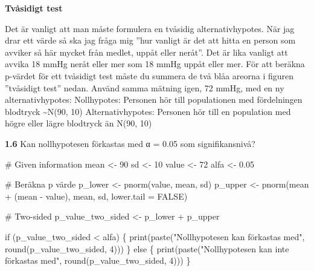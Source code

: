 \documentclass[
  letterpaper,
  DIV=11,
  numbers=noendperiod]{scrartcl}
\newenvironment{Shaded}{\begin{snugshade}}{\end{snugshade}}
\newcommand{\AttributeTok}[1]{\textcolor[rgb]{0.40,0.45,0.13}{#1}}
\newcommand{\CommentTok}[1]{\textcolor[rgb]{0.37,0.37,0.37}{#1}}
\newcommand{\ConstantTok}[1]{\textcolor[rgb]{0.56,0.35,0.01}{#1}}
\newcommand{\ControlFlowTok}[1]{\textcolor[rgb]{0.00,0.23,0.31}{#1}}
\newcommand{\DecValTok}[1]{\textcolor[rgb]{0.68,0.00,0.00}{#1}}
\newcommand{\FloatTok}[1]{\textcolor[rgb]{0.68,0.00,0.00}{#1}}
\newcommand{\FunctionTok}[1]{\textcolor[rgb]{0.28,0.35,0.67}{#1}}
\newcommand{\NormalTok}[1]{\textcolor[rgb]{0.00,0.23,0.31}{#1}}
\newcommand{\OtherTok}[1]{\textcolor[rgb]{0.00,0.23,0.31}{#1}}
\newcommand{\SpecialCharTok}[1]{\textcolor[rgb]{0.37,0.37,0.37}{#1}}
\newcommand{\StringTok}[1]{\textcolor[rgb]{0.13,0.47,0.30}{#1}}
\begin{document}
\textbf{Tvåsidigt test}

Det är vanligt att man måste formulera en tvåsidig alternativhypotes.
När jag drar ett värde så ska jag fråga mig ''hur vanligt är det att
hitta en person som avviker så här mycket från medlet, uppåt eller
neråt''. Det är lika vanligt att avvika 18 mmHg neråt eller mer som 18
mmHg uppåt eller mer. För att beräkna p-värdet för ett tvåsidigt test
måste du summera de två blåa areorna i figuren ''tvåsidigt test'' nedan.
Använd samma mätning igen, 72 mmHg, med en ny alternativhypotes:
Nollhypotes: Personen hör till populationen med fördelningen blodtryck
\textasciitilde N(90, 10) Alternativhypotes: Personen hör till en
population med högre eller lägre blodtryck än N(90, 10)

\textbf{1.6} Kan nollhypotesen förkastas med α = 0.05 som
signifikansnivå?

\begin{Shaded}
\begin{Highlighting}[]
\CommentTok{\# Given information}
\NormalTok{mean }\OtherTok{\textless{}{-}} \DecValTok{90}
\NormalTok{sd }\OtherTok{\textless{}{-}} \DecValTok{10}
\NormalTok{value }\OtherTok{\textless{}{-}} \DecValTok{72}
\NormalTok{alfa }\OtherTok{\textless{}{-}} \FloatTok{0.05}

\CommentTok{\# Beräkna p värde}
\NormalTok{p\_lower }\OtherTok{\textless{}{-}} \FunctionTok{pnorm}\NormalTok{(value, mean, sd)}
\NormalTok{p\_upper }\OtherTok{\textless{}{-}} \FunctionTok{pnorm}\NormalTok{(mean }\SpecialCharTok{+}\NormalTok{ (mean }\SpecialCharTok{{-}}\NormalTok{ value), mean, sd, }\AttributeTok{lower.tail =} \ConstantTok{FALSE}\NormalTok{)}

\CommentTok{\# Two{-}sided}
\NormalTok{p\_value\_two\_sided }\OtherTok{\textless{}{-}}\NormalTok{ p\_lower }\SpecialCharTok{+}\NormalTok{ p\_upper}

\ControlFlowTok{if}\NormalTok{ (p\_value\_two\_sided }\SpecialCharTok{\textless{}}\NormalTok{ alfa) \{}
  \FunctionTok{print}\NormalTok{(}\FunctionTok{paste}\NormalTok{(}\StringTok{"Nollhypotesen kan förkastas med"}\NormalTok{, }\FunctionTok{round}\NormalTok{(p\_value\_two\_sided, }\DecValTok{4}\NormalTok{)))}
\NormalTok{\} }\ControlFlowTok{else}\NormalTok{ \{}
  \FunctionTok{print}\NormalTok{(}\FunctionTok{paste}\NormalTok{(}\StringTok{"Nollhypotesen kan inte förkastas med"}\NormalTok{, }\FunctionTok{round}\NormalTok{(p\_value\_two\_sided, }\DecValTok{4}\NormalTok{)))}
\NormalTok{\}}
\end{Highlighting}
\end{Shaded}
\end{document}
